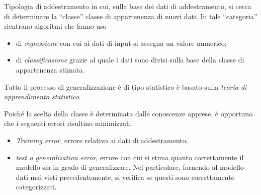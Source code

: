 \documentclass{subfiles}
\begin{document}
Tipologia di addestramento in cui, sulla base dei dati di addestramento, si cerca di determinare la ``classe'' classe di appartenenza di nuovi dati.
In tale ``categoria'' rientrano algoritmi che fanno uso 
\begin{itemize}
    \item di \emph{regressione} con cui ai dati di input si assegna un valore numerico;
    \item di \emph{classificazione} grazie al quale i dati sono divisi sulla base della classe di appartenenza stimata.
\end{itemize}

\begin{Remark*}
    Tutto il processo di generalizzazione è di tipo statistico è basato sulla \emph{teoria di apprendimento statistico\footnotemark[2]}.
\end{Remark*}

Poiché la scelta della classe è determinata dalle conoscenze apprese, è opportuno che i seguenti errori risultino minimizzati.
\begin{itemize}
    \item \emph{Training error}, errore relativo ai dati di addestramento;
    \item \emph{test \emph{o} generalization error}, errore con cui si stima quanto correttamente il modello sia in grado di generalizzare.
          Nel particolare, fornendo al modello dati mai visti precedentemente, si verifica se questi sono correttamente categorizzati.
\end{itemize}
\end{document}
